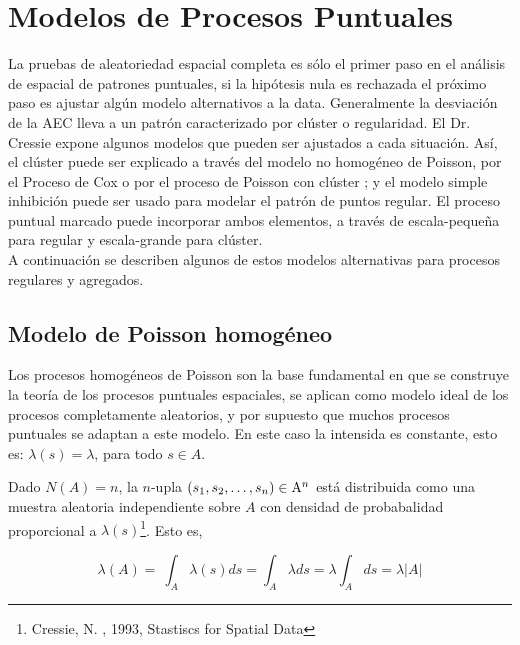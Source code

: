 \documentclass[12pt]{report}
\begin{document}
		
		
		
		\section{Modelos de Procesos Puntuales} 
		
		
		La pruebas de aleatoriedad espacial completa es sólo el primer paso en el análisis de espacial de patrones puntuales, si la hipótesis nula  es rechazada el próximo paso es ajustar algún  modelo alternativos a la data. Generalmente la desviación de la AEC  lleva a un patrón  caracterizado por clúster o regularidad.  El Dr. Cressie expone algunos modelos que pueden ser ajustados a cada situación. Así, el clúster puede ser explicado a través del modelo no homogéneo de Poisson, por el  Proceso de Cox o por el proceso  de Poisson con clúster ; y el modelo simple inhibición puede ser usado para modelar el patrón de puntos regular.   El proceso puntual marcado puede incorporar ambos elementos,  a través de escala-pequeña  para regular y escala-grande para clúster.  \\
		
		
		A continuación se describen algunos de estos modelos alternativas para procesos regulares y agregados.\\
		
		
		
		\subsection{Modelo de Poisson  homogéneo}{\label{Poisson4}} {\label{Intensidad_Homogenea}}
		
		Los procesos homogéneos de Poisson son la base fundamental en que se construye la teoría de los procesos puntuales espaciales, se aplican como modelo ideal de los procesos completamente aleatorios, y por supuesto que  muchos procesos puntuales se adaptan a este modelo.   En este caso la intensida es constante, esto es:  $ \lambda(s) = \lambda$, para todo $s\in A$.
		
		Dado $N(A) = n$,  la $n$-upla $ (s_{1}, s_{2},\dots, s_{n} ) \in   {\rm  A }^{n} $  está  distribuida como una muestra aleatoria  independiente sobre $A$ con densidad de probabalidad proporcional a $\lambda(s)${\footnote{Cressie, N. , 1993, Stastiscs for Spatial Data}}. Esto es,   
		
		
		
		
		
		\[   \lambda(A) = \: \int_{A} \lambda(s) ds = \int_{A} \lambda ds = \lambda\int_{A} ds = \lambda |A|\]
		
\end{document}

